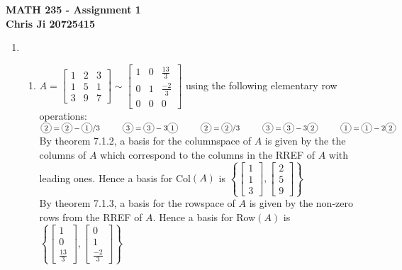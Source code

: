 \documentclass[10pt,english]{article}
\newcommand*\circled[1]{\tikz[baseline=(char.base)]{
            \node[shape=circle,draw,inner sep=2pt] (char) {#1};}}
\begin{document}
\noindent \begin{center}
\textbf{\large{}MATH 235 - Assignment 1}\\
\textbf{\large{}Chris Ji 20725415}
\par\end{center}{\large \par}
\medskip{}

\begin{enumerate}
\item \begin{enumerate}
    \item $A=\begin{bmatrix}1&2&3\\1&5&1\\3&9&7\end{bmatrix}\sim\begin{bmatrix}1&0&\frac{13}{3}\\0&1&\frac{-2}{3}\\0&0&0\end{bmatrix}$ using the following elementary row operations: \\ $\circled{2}=\circled{2}-\circled{1}/3\quad\quad\quad\circled{3}=\circled{3}-3\circled{1}\quad\quad\quad\circled{2}=\circled{2}/3\quad\quad\quad\circled{3}=\circled{3}-3\circled{2}\quad\quad\quad \circled{1}=\circled{1}-2\circled{2}$ \\
By theorem 7.1.2, a basis for the columnspace of $A$ is given by the the columns of $A$ which correspond to the columns in the RREF of $A$ with leading ones. Hence a basis for Col$(A)$ is $\left\{\begin{bmatrix}1\\1\\3\end{bmatrix},\begin{bmatrix}2\\5\\9\end{bmatrix}\right\}$\\
By theorem 7.1.3, a basis for the rowspace of $A$ is given by the non-zero rows from the RREF of $A$. Hence a basis for Row$(A)$ is $\left\{\begin{bmatrix}1\\0\\\frac{13}{3}\end{bmatrix},\begin{bmatrix}0\\1\\\frac{-2}{3}\end{bmatrix}\right\}$\\

\end{enumerate}
\end{enumerate}
\end{document}
